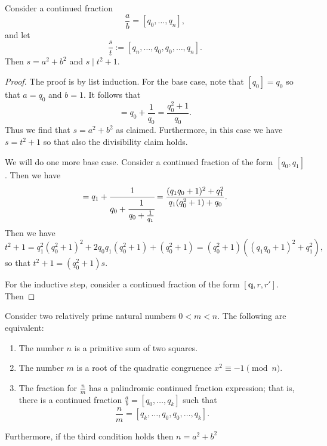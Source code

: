\begin{noteblock}
\begin{theorem}
  Consider a continued fraction
  \begin{equation*}
    \frac{a}{b} = [q_0,\ldots,q_n],
  \end{equation*}
  and let
  \begin{equation*}
    \frac{s}{t} := [q_n,\ldots,q_0,q_0,\ldots,q_n].
  \end{equation*}
  Then $s=a^2+b^2$ and $s\mid t^2+1$.
\end{theorem}

\begin{proof}
  The proof is by list induction. For the base case, note that $[q_0]=q_0$ so that $a=q_0$ and $b=1$. It follows that 
  \begin{equation*}
    [q_0,q_0]=q_0+\frac{1}{q_0}=\frac{q_0^2+1}{q_0}.
  \end{equation*}
  Thus we find that $s=a^2+b^2$ as claimed. Furthermore, in this case we have $s=t^2+1$ so that also the divisibility claim holds.

  We will do one more base case. Consider a continued fraction of the form $[q_0,q_1]$. Then we have
  \begin{equation*}
    [q_1,q_0,q_0,q_1]=q_1+\cfrac{1}{q_0+\cfrac{1}{q_0+\frac{1}{q_1}}}=\frac{(q_1q_0+1)^2+q_1^2}{q_1(q_0^2+1)+q_0}.
  \end{equation*}
  Then we have
  \begin{equation*}
    t^2+1=q_1^2(q_0^2+1)^2+2q_0q_1(q_0^2+1)+(q_0^2+1)=(q_0^2+1)((q_1q_0+1)^2+q_1^2),
  \end{equation*}
  so that $t^2+1=(q_0^2+1)s$. 

  For the inductive step, consider a continued fraction of the form $[\symbf{q},r,r']$. Then
\end{proof}

\begin{theorem}
  Consider two relatively prime natural numbers $0<m<n$. The following are equivalent:
  \begin{enumerate}
  \item The number $n$ is a primitive sum of two squares.
  \item The number $m$ is a root of the quadratic congruence $x^2\equiv -1\pmod{n}$.
  \item The fraction for $\frac{n}{m}$ has a palindromic continued fraction expression; that is, there is a continued fraction $\frac{a}{b}=[q_0,\ldots,q_k]$ such that
    \begin{equation*}
      \frac{n}{m}=[q_k,\ldots,q_0,q_0,\ldots,q_k].
    \end{equation*}
  \end{enumerate}
  Furthermore, if the third condition holds then $n=a^2+b^2$
\end{theorem}


\end{noteblock}
